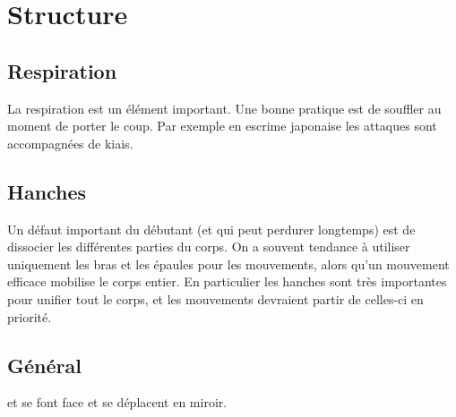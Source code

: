 \chapter{Structure}


\section{Respiration}

La respiration est un élément important. Une bonne pratique est de souffler au moment de porter le coup. Par exemple en escrime japonaise les attaques sont accompagnées de kiais.

\section{Hanches}

Un défaut important du débutant (et qui peut perdurer longtemps) est de dissocier les différentes parties du corps. On a souvent tendance à utiliser uniquement les bras et les épaules pour les mouvements, alors qu'un mouvement efficace mobilise le corps entier. En particulier les hanches sont très importantes pour unifier tout le corps, et les mouvements devraient partir de celles-ci en priorité.

\section{Général}

\cite{kohlweiss:hemac:ringen:2014}

\begin{exercice}
\label{ex:general:miroir}

\A et \D se font face et se déplacent en miroir.
\end{exercice}

